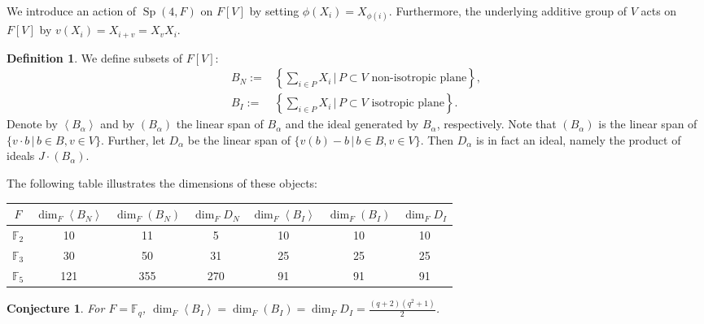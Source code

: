 \documentclass{amsart}
\DeclareMathOperator{\Sp}{Sp}
\theoremstyle{plain}
\newtheorem{conjecture}[theorem]{Conjecture}
\theoremstyle{definition}
\newtheorem{definition}[theorem]{Definition}
\theoremstyle{remark}
\begin{document}
We introduce an action of $\Sp (4,F)$ on $F[V]$ by setting $\phi(X_i) = X_{\phi(i)}$. Furthermore, the underlying additive group of $V$ acts on $F[V]$ by $v( X_i) = X_{i+v} =X_vX_i$. 

\begin{definition} We define subsets of $F[V]$:
\begin{align*}
B_N :=  & \left\{\sum_{i\in P}X_i \,|\, P\subset V \text{ non-isotropic plane}\right\}, \\
B_I := &  \left\{\sum_{i\in P}X_i \,|\, P\subset V \text{ isotropic plane}\right\}.
\end{align*}
Denote by $\left< B_\alpha \right>$ and by $(B_\alpha)$ the linear span of $B_\alpha$ and the ideal generated by $B_\alpha$, respectively. Note that $(B_\alpha) $ is the linear span of $ \{ v\cdot b \,|\, b\in B, v\in V \}$.
Further, let $D_\alpha$ be the linear span of $\{v(b) - b \,|\, b\in B, v\in V \}$. Then $D_\alpha$ is in fact an ideal, namely the product of ideals $J\cdot (B_\alpha)$.
\end{definition}
The following table illustrates the dimensions of these objects:
\vspace{2mm}

\begin{tabular}{c||c|c|c||c|c|c}
 $F$ & $\dim_F \left<B_N\right>$ & $\dim_F(B_N)$ & $\dim_F D_N$ & $\dim_F \left<B_I\right>$ & $\dim_F(B_I)$ & $\dim_F D_I $\\
\hline
$\mathbb F_2$ & 10 & 11 &  5 & 10 & 10 & 10 \\
$\mathbb F_3$ & 30 & 50 & 31 & 25 & 25 & 25 \\
$\mathbb F_5$ &121 &355 &270 & 91 & 91 & 91 
\end{tabular}
\begin{conjecture}
For $F=\mathbb F_q$, $\dim_F \left<B_I\right>=\dim_F(B_I)=\dim_F D_I = \frac{(q+2)(q^2+1)}{2}$.
\end{conjecture}
\end{document}
